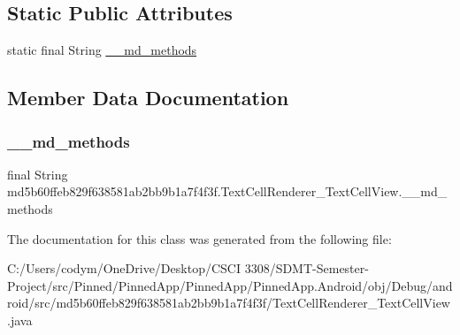 \subsection*{Static Public Attributes}
\begin{DoxyCompactItemize}
\item 
static final String \hyperlink{classmd5b60ffeb829f638581ab2bb9b1a7f4f3f_1_1_text_cell_renderer___text_cell_view_a00b3617596bc3d87d289d2fa7895a853}{\+\_\+\+\_\+md\+\_\+methods}
\end{DoxyCompactItemize}


\subsection{Member Data Documentation}
\mbox{\label{classmd5b60ffeb829f638581ab2bb9b1a7f4f3f_1_1_text_cell_renderer___text_cell_view_a00b3617596bc3d87d289d2fa7895a853}} 
\subsubsection{\texorpdfstring{\+\_\+\+\_\+md\+\_\+methods}{\_\_md\_methods}}
{\footnotesize\ttfamily final String md5b60ffeb829f638581ab2bb9b1a7f4f3f.\+Text\+Cell\+Renderer\+\_\+\+Text\+Cell\+View.\+\_\+\+\_\+md\+\_\+methods\hspace{0.3cm}{\ttfamily [static]}}



The documentation for this class was generated from the following file\+:\begin{DoxyCompactItemize}
\item 
C\+:/\+Users/codym/\+One\+Drive/\+Desktop/\+C\+S\+C\+I 3308/\+S\+D\+M\+T-\/\+Semester-\/\+Project/src/\+Pinned/\+Pinned\+App/\+Pinned\+App/\+Pinned\+App.\+Android/obj/\+Debug/android/src/md5b60ffeb829f638581ab2bb9b1a7f4f3f/Text\+Cell\+Renderer\+\_\+\+Text\+Cell\+View.\+java\end{DoxyCompactItemize}
